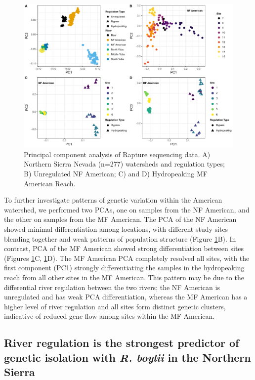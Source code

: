 \documentclass[twoside,12pt,final]{ucthesis-CA2012} %
\begin{document}
\begin{ucmainmatter}
\begin{figure}
\includegraphics[width=1\linewidth]{figure/ch1/fig_02_pca_combined_v2} \caption{Principal component analysis of Rapture sequencing
data. A) Northern Sierra Nevada (n=277) watersheds and regulation types;
B) Unregulated NF American; C) and D) Hydropeaking MF American Reach.}\label{fig:CH1F2pca}
\end{figure}
To further investigate patterns of genetic variation within the American
watershed, we performed two PCAs, one on samples from the NF American,
and the other on samples from the MF American. The PCA of the NF
American showed minimal differentiation among locations, with different
study sites blending together and weak patterns of population structure
(Figure \ref{fig:CH1F2pca}B). In contrast, PCA of the MF American showed
strong differentiation between sites (Figures \ref{fig:CH1F2pca}C,
\ref{fig:CH1F2pca}D). The MF American PCA completely resolved all sites,
with the first component (PC1) strongly differentiating the samples in
the hydropeaking reach from all other sites in the MF American. This
pattern may be due to the differential river regulation between the two
rivers; the NF American is unregulated and has weak PCA differentiation,
whereas the MF American has a higher level of river regulation and all
sites form distinct genetic clusters, indicative of reduced gene flow
among sites within the MF American.

\hypertarget{river-regulation-is-the-strongest-predictor-of-genetic-isolation-with-r.-boylii-in-the-northern-sierra}{%
\subsection{\texorpdfstring{River regulation is the strongest predictor
of genetic isolation with \emph{R. boylii} in the Northern
Sierra}{River regulation is the strongest predictor of genetic isolation with R. boylii in the Northern Sierra}}\label{river-regulation-is-the-strongest-predictor-of-genetic-isolation-with-r.-boylii-in-the-northern-sierra}}


\end{ucmainmatter}
\end{document}
